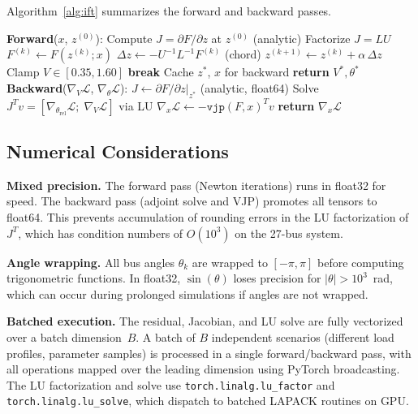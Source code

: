 \documentclass[11pt]{article}
\begin{document}
Algorithm~\ref{alg:ift} summarizes the forward and backward passes.

\begin{algorithm}[t]
\caption{Differentiable KCL Solve (Forward + IFT Backward)}
\label{alg:ift}
\begin{algorithmic}[1]
\STATE \textbf{Forward}($x$, $z^{(0)}$):
\STATE Compute $J = \partial F / \partial z$ at $z^{(0)}$ (analytic)
\STATE Factorize $J = LU$
  \STATE $F^{(k)} \leftarrow F(z^{(k)}; x)$
  \STATE $\Delta z \leftarrow -U^{-1}L^{-1}F^{(k)}$ \quad (chord)
  \STATE $z^{(k+1)} \leftarrow z^{(k)} + \alpha\,\Delta z$
  \STATE Clamp $V \in [0.35, 1.60]$
    \STATE \textbf{break}
  \ENDIF
\ENDFOR
\STATE Cache $z^*$, $x$ for backward
\STATE \textbf{return} $V^*, \theta^*$
\STATE
\STATE \textbf{Backward}($\nabla_V \mathcal{L}$,
  $\nabla_\theta \mathcal{L}$):
\STATE $J \leftarrow \partial F / \partial z \big|_{z^*}$
  \quad (analytic, float64)
\STATE Solve $J^T v = [\nabla_{\theta_{\mathrm{rel}}} \mathcal{L};\;
  \nabla_V \mathcal{L}]$ via LU
\STATE $\nabla_x \mathcal{L} \leftarrow
  -\texttt{vjp}(F, x)^T v$
\STATE \textbf{return} $\nabla_x \mathcal{L}$
\end{algorithmic}
\end{algorithm}


\subsection{Numerical Considerations}
\label{sec:numerics}

\textbf{Mixed precision.}  The forward pass (Newton iterations) runs
in float32 for speed.  The backward pass (adjoint solve and VJP)
promotes all tensors to float64.  This prevents accumulation of
rounding errors in the LU factorization of $J^T$, which has
condition numbers of $O(10^3)$ on the 27-bus system.

\textbf{Angle wrapping.}  All bus angles $\theta_k$ are wrapped to
$[-\pi, \pi]$ before computing trigonometric functions.  In float32,
$\sin(\theta)$ loses precision for $|\theta| > 10^3$~rad, which can
occur during prolonged simulations if angles are not wrapped.

\textbf{Batched execution.}  The residual, Jacobian, and LU solve
are fully vectorized over a batch dimension~$B$.  A batch of $B$
independent scenarios (different load profiles, parameter samples) is
processed in a single forward/backward pass, with all operations
mapped over the leading dimension using PyTorch broadcasting.  The
LU factorization and solve use \texttt{torch.linalg.lu\_factor} and
\texttt{torch.linalg.lu\_solve}, which dispatch to batched LAPACK
routines on GPU.
\end{document}
